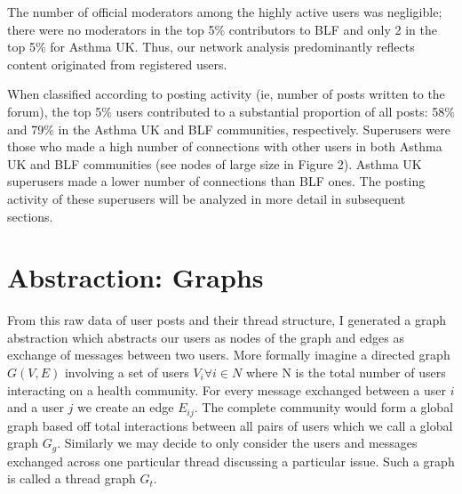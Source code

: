 The number of official moderators among the highly active users was negligible; there were no moderators in the top 5\% contributors to BLF and only 2 in the top 5\% for Asthma UK. Thus, our network analysis predominantly reflects content originated from registered users.

When classified according to posting activity (ie, number of posts written to the forum), the top 5\% users contributed to a substantial proportion of all posts: 58\% and 79\% in the Asthma UK and BLF communities, respectively. Superusers were those who made a high number of connections with other users in both Asthma UK and BLF communities (see nodes of large size in Figure 2). Asthma UK superusers made a lower number of connections than BLF ones. The posting activity of these superusers will be analyzed in more detail in subsequent sections.


\section{Abstraction: Graphs}
From this raw data of user posts and their thread structure, I generated a graph abstraction which abstracts our users as nodes of the graph and edges as exchange of messages between two users. More formally imagine a directed graph $G(V,E)$ involving a set of users $V_i\forall i \in N$ where N is the total number of users interacting on a health community. For every message exchanged between a user $i$ and a user $j$ we create an edge $E_{ij}$. The complete community would form a global graph based off total interactions between all pairs of users which we call a global graph $G_g$. Similarly we may decide to only consider the users and messages exchanged across one particular thread discussing a particular issue. Such a graph is called a thread graph $G_t$.

